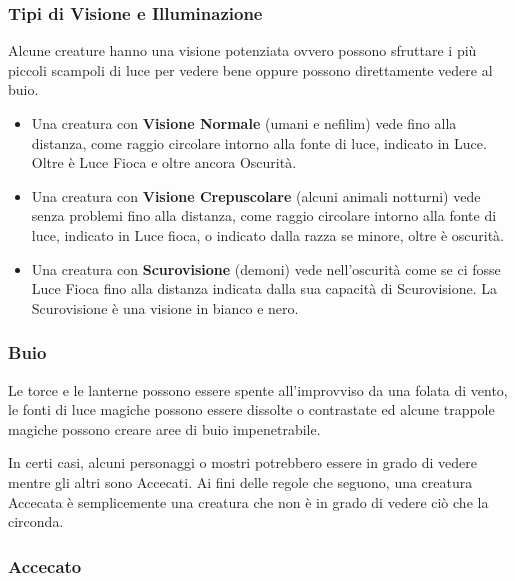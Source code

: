 \documentclass[12pt,a4paper,twoside,openany]{book}
\begin{document}
\begin{multicols}{2}
\subsubsection{Tipi di Visione e Illuminazione}

Alcune creature hanno una visione potenziata ovvero possono sfruttare i più piccoli scampoli di luce per vedere bene oppure possono direttamente vedere al buio.

\begin{itemize}
\item
Una creatura con \textbf{Visione Normale} (umani e nefilim) vede fino alla distanza, come raggio circolare intorno alla fonte di luce, indicato in Luce. Oltre è Luce Fioca e oltre ancora Oscurità.

\item
Una creatura con \textbf{Visione Crepuscolare} (alcuni animali notturni) vede senza problemi fino alla distanza, come raggio circolare intorno alla fonte di luce, indicato in Luce fioca, o indicato dalla razza se minore, oltre è oscurità.

\item
Una creatura con \textbf{Scurovisione} (demoni)  vede nell'oscurità come se ci fosse Luce Fioca fino alla distanza indicata dalla sua capacità di Scurovisione.
La Scurovisione è una visione in bianco e nero.
\end{itemize}


\subsubsection{Buio}

\label{buio}

Le torce e le lanterne possono essere spente all'improvviso da una folata di vento, le fonti di luce magiche possono essere dissolte o contrastate ed alcune trappole magiche possono creare aree di buio impenetrabile.

In certi casi, alcuni personaggi o mostri potrebbero essere in grado di vedere mentre gli altri sono Accecati. Ai fini delle regole che seguono, una creatura Accecata è semplicemente una creatura che non è in grado di vedere ciò che la circonda.

\subsubsection{Accecato}


\end{multicols}
\end{document}
